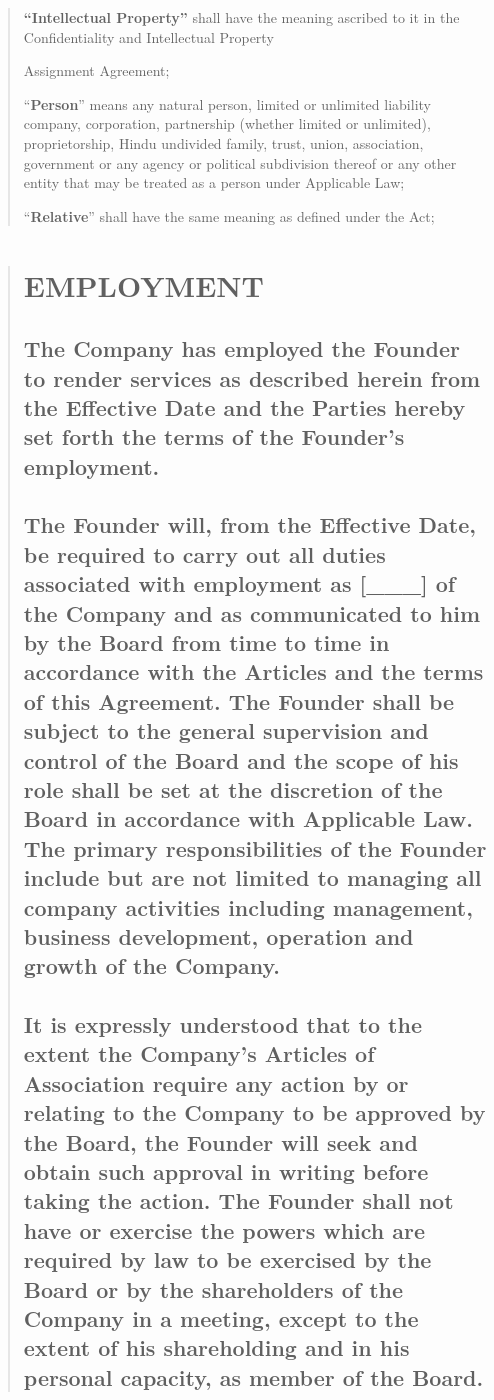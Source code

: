 \documentclass[
]{article}
\begin{document}
\begin{quote}
\textbf{``Intellectual Property''} shall have the meaning ascribed to it
in the Confidentiality and Intellectual Property

Assignment Agreement;

``\textbf{Person}'' means any natural person, limited or unlimited
liability company, corporation, partnership (whether limited or
unlimited), proprietorship, Hindu undivided family, trust, union,
association, government or any agency or political subdivision thereof
or any other entity that may be treated as a person under Applicable
Law;

``\textbf{Relative}'' shall have the same meaning as defined under the
Act;
\end{quote}

\begin{quote}
\section{EMPLOYMENT}

\subsection{The Company has employed the Founder to render services as described herein from the Effective Date and the Parties hereby set forth the terms of the Founder’s employment.}

\subsection{The Founder will, from the Effective Date, be required to carry out all duties associated with employment as [\_\_\_] of the Company and as communicated to him by the Board from time to time in accordance with the Articles and the terms of this Agreement. The Founder shall be subject to the general supervision and control of the Board and the scope of his role shall be set at the discretion of the Board in accordance with Applicable Law. The primary responsibilities of the Founder include but are not limited to managing all company activities including management, business development, operation and growth of the Company.}

\subsection{It is expressly understood that to the extent the Company’s Articles of Association require any action by or relating to the Company to be approved by the Board, the Founder will seek and obtain such approval in writing before taking the action. The Founder shall not have or exercise the powers which are required by law to be exercised by the Board or by the shareholders of the Company in a meeting, except to the extent of his shareholding and in his personal capacity, as member of the Board.}


\end{quote}
\end{document}
